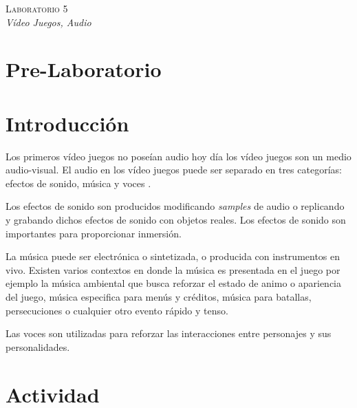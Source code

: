 \begin{center}
\textsc{\Large Laboratorio 5}~\\
\emph{\large Vídeo Juegos, Audio}
\end{center}

\section{Pre-Laboratorio}

\section{Introducción}
Los primeros vídeo juegos no poseían audio hoy día los vídeo juegos son un medio audio-visual. El audio en los vídeo juegos puede ser separado en tres categorías: efectos de sonido, música y voces \cite{erikgamedevelopment}.

Los efectos de sonido son producidos modificando \emph{samples} de audio o replicando y grabando dichos efectos de sonido con objetos reales. Los efectos de sonido son importantes para proporcionar inmersión. 

La música puede ser electrónica o sintetizada, o producida con instrumentos en vivo. Existen varios contextos en donde la música es presentada en el juego por ejemplo la música ambiental que busca reforzar el estado de animo o apariencia del juego, música especifica para menús y créditos, música para batallas, persecuciones o cualquier otro evento rápido y tenso.

Las voces son utilizadas para reforzar las interacciones entre personajes y sus personalidades.

\section{Actividad}
